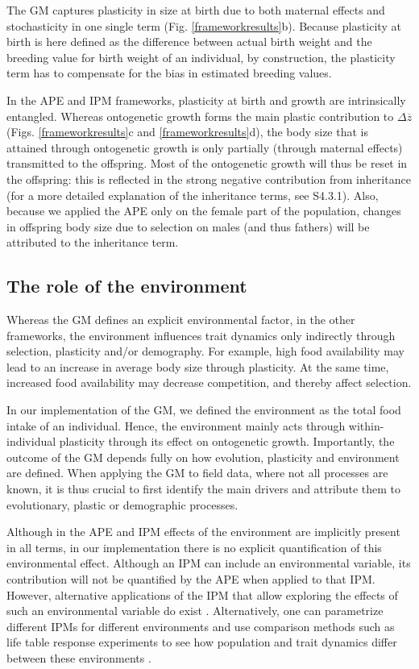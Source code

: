 The GM captures plasticity in size at birth due to both maternal effects and stochasticity in one single term (Fig. \ref{frameworkresults}b). Because plasticity at birth is here defined as the difference between actual birth weight and the breeding value for birth weight of an individual, by construction, the plasticity term has to compensate for the bias in estimated breeding values.

In the APE and IPM frameworks, plasticity at birth and growth are intrinsically entangled. Whereas ontogenetic growth forms the main plastic contribution to $\Delta \overline z$ (Figs. \ref{frameworkresults}c and \ref{frameworkresults}d), the body size that is attained through ontogenetic growth is only partially (through maternal effects) transmitted to the offspring. Most of the ontogenetic growth will thus be reset in the offspring: this is reflected in the strong negative contribution from inheritance (for a more detailed explanation of the inheritance terms, see S4.3.1). Also, because we applied the APE only on the female part of the population, changes in offspring body size due to selection on males (and thus fathers) will be attributed to the inheritance term.

\subsection*{The role of the environment}
Whereas the GM defines an explicit environmental factor, in the other frameworks, the environment influences trait dynamics only indirectly through selection, plasticity and/or demography. For example, high food availability may lead to an increase in average body size through plasticity. At the same time, increased food availability may decrease competition, and thereby affect selection.

In our implementation of the GM, we defined the environment as the total food intake of an individual. Hence, the environment mainly acts through within-individual plasticity through its effect on ontogenetic growth. Importantly, the outcome of the GM depends fully on how evolution, plasticity and environment are defined. When applying the GM to field data, where not all processes are known, it is thus crucial to first identify the main drivers and attribute them to evolutionary, plastic or demographic processes.

Although in the APE and IPM effects of the environment are implicitly present in all terms, in our implementation there is no explicit
quantification of this environmental effect. Although an IPM can include an environmental variable, its contribution will not be quantified by the APE when applied to that IPM. However, alternative applications of the IPM that allow exploring the effects of such an environmental variable do exist \parencite[e.g.][]{vindenes2011}. Alternatively, one can parametrize different IPMs for different environments \parencite[e.g.][]{Ozgul2010} and use comparison methods such as life table response experiments to see how population and trait dynamics differ between these environments \parencite{rees2009}.

